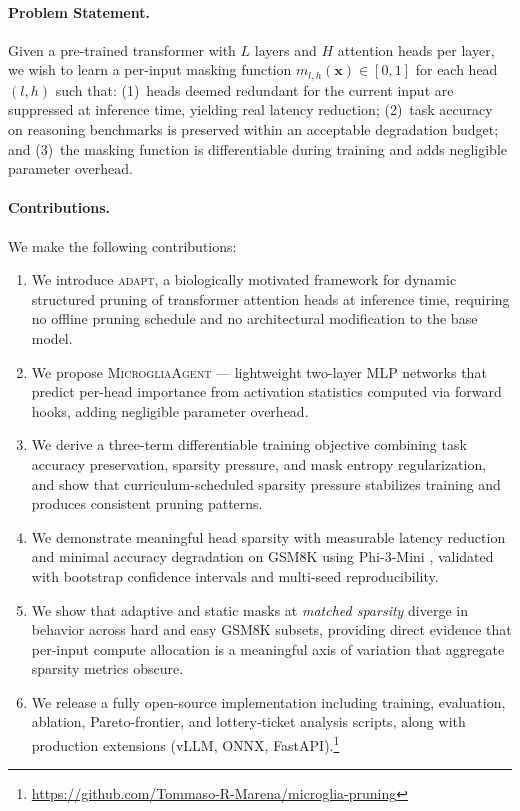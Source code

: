 \documentclass{article}
\newcommand{\agent}{\textsc{MicrogliaAgent}}
\newcommand{\system}{\textsc{adapt}}
\begin{document}
\paragraph{Problem Statement.}
Given a pre-trained transformer with $L$ layers and $H$ attention heads per layer, we wish to
learn a per-input masking function $m_{l,h}(\mathbf{x}) \in [0, 1]$ for each head $(l, h)$
such that: (1)~heads deemed redundant for the current input are suppressed at inference time,
yielding real latency reduction; (2)~task accuracy on reasoning benchmarks is preserved within
an acceptable degradation budget; and (3)~the masking function is differentiable during
training and adds negligible parameter overhead.

\paragraph{Contributions.}
We make the following contributions:
\begin{enumerate}
  \item We introduce \system{}, a biologically motivated framework for dynamic structured
        pruning of transformer attention heads at inference time, requiring no offline pruning
        schedule and no architectural modification to the base model.

  \item We propose \agent{} --- lightweight two-layer MLP networks that predict per-head
        importance from activation statistics computed via forward hooks, adding negligible
        parameter overhead.

  \item We derive a three-term differentiable training objective combining task accuracy
        preservation, sparsity pressure, and mask entropy regularization, and show that
        curriculum-scheduled sparsity pressure stabilizes training and produces consistent
        pruning patterns.

  \item We demonstrate meaningful head sparsity with measurable latency reduction and
        minimal accuracy degradation on GSM8K \citep{cobbe2021gsm8k} using Phi-3-Mini
        \citep{abdin2024phi3}, validated with bootstrap confidence intervals and multi-seed
        reproducibility.

  \item We show that adaptive and static masks at \emph{matched sparsity} diverge in
        behavior across hard and easy GSM8K subsets, providing direct evidence that
        per-input compute allocation is a meaningful axis of variation that aggregate
        sparsity metrics obscure.

  \item We release a fully open-source implementation including training, evaluation,
        ablation, Pareto-frontier, and lottery-ticket analysis scripts, along with
        production extensions (vLLM, ONNX, FastAPI).\footnote{%
        \url{https://github.com/Tommaso-R-Marena/microglia-pruning}}
\end{enumerate}
\end{document}
